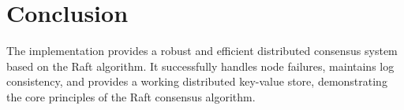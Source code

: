 \documentclass{article}
\begin{document}
\section{Conclusion}
The implementation provides a robust and efficient distributed consensus system based on the Raft algorithm. It successfully handles node failures, maintains log consistency, and provides a working distributed key-value store, demonstrating the core principles of the Raft consensus algorithm.
\end{document}

